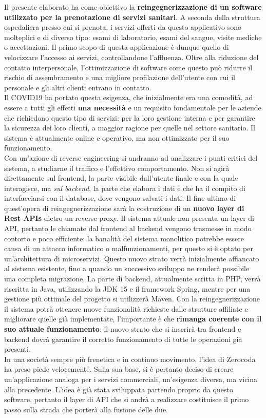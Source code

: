 \documentclass[
    corpo=11pt,
    twoside,
]{toptesi}
\begin{document}
\sommario %
Il presente elaborato ha come obiettivo la \textbf{reingegnerizzazione di un software utilizzato per la prenotazione di servizi sanitari}. A seconda della struttura ospedaliera presso cui si prenota, i servizi offerti da questo applicativo sono molteplici e di diverso tipo: esami di laboratorio, esami del sangue, visite mediche o accettazioni. Il primo scopo di questa applicazione è dunque quello di velocizzare l'accesso ai servizi, controllandone l'affluenza. Oltre alla riduzione del contatto interpersonale, l'ottimizzazione di software come questo può ridurre il rischio di assembramento e una migliore profilazione dell'utente con cui il personale e gli altri clienti entrano in contatto.\\
Il COVID19 ha portato questa esigenza, che inizialmente era una comodità, ad essere a tutti gli effetti \textbf{una necessità} e un requisito fondamentale per le aziende che richiedono questo tipo di servizi: per la loro gestione interna e per garantire la sicurezza dei loro clienti, a maggior ragione per quelle nel settore sanitario. Il sistema è attualmente online e operativo, ma non ottimizzato per il suo funzionamento. \\Con un'azione di reverse engineering si andranno ad analizzare i punti critici del sistema, a studiarne il traffico e l'effettivo comportamento. Non si agirà direttamente sul frontend, la parte visibile dall'utente finale e con la quale interagisce, ma \textit{sul backend}, la parte che elabora i dati e che ha il compito di interfacciarsi con il database, dove vengono salvati i dati. Il fine ultimo di quest'opera di reingegnerizzazione sarà la costruzione di un \textbf{nuovo layer di Rest APIs} dietro un reverse proxy. Il sistema attuale non presenta un layer di API, pertanto le chiamate dal frontend al backend vengono trasmesse in modo contorto e poco efficiente: la banalità del sistema monolitico potrebbe essere causa di un attacco informatico o malfunzionamenti, per questo si è optato per un'architettura di microservizi. Questo nuovo strato verrà inizialmente affiancato al sistema esistente, fino a quando un successivo sviluppo ne renderà possibile una completa migrazione. La parte di backend, attualmente scritta in PHP, verrà riscritta in Java, utilizzando la JDK 15 e il framework Spring, mentre per una gestione più ottimale del progetto si utilizzerà Maven. Con la reingegnerizzazione il sistema potrà ottenere nuove funzionalità richieste dalle strutture affiliate e migliorare quelle già implementate, l'importante è che \textbf{rimanga coerente con il suo attuale funzionamento}: il nuovo strato che si inserirà tra frontend e backend dovrà garantire il corretto funzionamento di tutte le operazioni già presenti.\\
In una società sempre più frenetica e in continuo movimento, l'idea di Zerocoda ha preso piede velocemente. Sulla sua base, si è pertanto deciso di creare un'applicazione analoga per i servizi commerciali, un'esigenza  diversa, ma vicina alla precedente. L'idea è già stata sviluppata partendo proprio da questo software, pertanto il layer di API che si andrà a realizzare costituisce il primo passo sulla strada che porterà alla fusione delle due.
\end{document}

